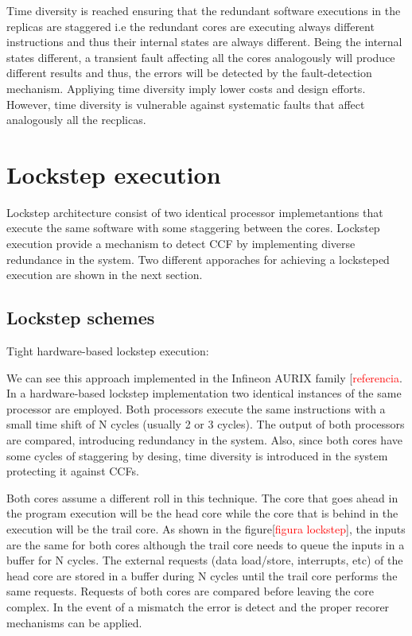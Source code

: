 Time diversity is reached ensuring that the redundant software executions in the replicas are staggered i.e the redundant cores are executing always different instructions and thus their internal states are always different. Being the internal states different, a transient fault affecting all the cores analogously will produce different results and thus, the errors will be detected by the fault-detection mechanism. Appliying time diversity imply lower costs and design efforts. However, time diversity is vulnerable against systematic faults that affect analogously all the recplicas.



\section{Lockstep execution}

Lockstep architecture consist of two identical processor implemetantions that execute the same software with some staggering between the cores. Lockstep execution provide a mechanism to detect CCF by implementing diverse redundance in the system. Two different apporaches for achieving a locksteped execution are shown in the next section.

\subsection{Lockstep schemes}

Tight hardware-based lockstep execution: 

We can see this approach implemented in the Infineon AURIX family [\textcolor{red}{referencia}. In a hardware-based lockstep implementation two identical instances of the same processor are employed. Both processors execute the same instructions with a small time shift of N cycles (usually 2 or 3 cycles). The output of both processors are compared, introducing redundancy in the system. Also, since both cores have some cycles of staggering by desing, time diversity is introduced in the system protecting it against CCFs. 

Both cores assume a different roll in this technique. The core that goes ahead in the program execution will be the head core while the core that is behind in the execution will be the trail core. As shown in the figure[\textcolor{red}{figura lockstep}], the inputs are the same for both cores although the trail core needs to queue the inputs in a buffer for N cycles. The external requests (data load/store, interrupts, etc) of the head core are stored in a buffer during N cycles until the trail core performs the same requests. Requests of both cores are compared before leaving the core complex. In the event of a mismatch the error is detect and the proper recorer mechanisms can be applied.

